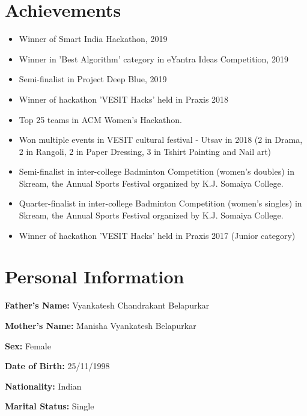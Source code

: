 \documentclass[margin]{res}
\begin{document}
\begin{resume}
\section{Achievements}
\begin{itemize}
\item Winner of Smart India Hackathon, 2019
\item Winner in 'Best Algorithm' category in eYantra Ideas Competition, 2019
\item Semi-finalist in Project Deep Blue, 2019
\item Winner of hackathon 'VESIT Hacks' held in Praxis 2018
\item Top 25 teams in ACM Women's Hackathon. 
\item Won multiple events in VESIT cultural festival - Utsav in 2018 (2 in Drama, 2 in Rangoli, 2 in Paper Dressing, 3 in Tshirt Painting and Nail art)
\item Semi-finalist in inter-college Badminton Competition (women's doubles) in Skream, the Annual Sports Festival organized by K.J. Somaiya College.
\item Quarter-finalist in inter-college Badminton Competition (women's singles) in Skream, the Annual Sports Festival organized by K.J. Somaiya College.
\item Winner of hackathon 'VESIT Hacks' held in Praxis 2017 (Junior category)
\end{itemize}

\section{Personal Information}
{\bf Father's Name:} Vyankatesh Chandrakant Belapurkar

{\bf Mother's Name:} Manisha Vyankatesh Belapurkar

{\bf Sex:} Female

{\bf Date of Birth:} 25/11/1998

{\bf Nationality:} Indian

{\bf Marital Status:} Single


\end{resume}
\end{document}
